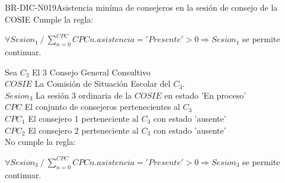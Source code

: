 \begin{BusinessRule}{BR-DIC-N019}{Asistencia miníma de consejeros en la sesión de consejo de la COSIE}
	Cumple la regla:
		\begin{center}
			$  \forall Sesion_{1} \: / \: \sum_{n=0}^{CPC}CPC{n}.{asistencia='Presente'} > 0 \Rightarrow Sesion_{1}$ se permite continuar.
		\end{center}
	Sea $ C_{3}$ El 3 Consejo General Consultivo\\
$COSIE$ La Comisión de Situación Escolar del $ C_{3}$.\\
$Sesion_{3}$ La sesión 3 ordinaria  de la $COSIE$ en estado 'En proceso' \\
$CPC$ El conjunto de consejeros pertenecientes al $C_{3}$ \\ 
$CPC_{1}$ El consejero 1 perteneciente al $C_{3}$ con estado 'ausente'\\ 
$CPC_{2}$ El consejero 2 perteneciente al $C_{3}$ con estado 'ausente'\\ 


No cumple la regla:
	\begin{center}$  \forall Sesion_{3 } \: / \: \sum_{n=0}^{CPC}CPC{n}.{asistencia='Presente'} > 0 \Rightarrow Sesion_{3}$ se permite continuar.
	\end{center}
\end{BusinessRule}


